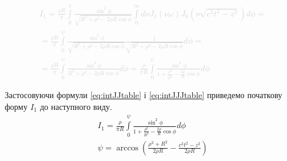 \textcolor{lightgray}{ \begin{equation*} \begin{aligned}
I_1 = \frac{\rho R}{\pi} \int\limits_{0}^{\pi} 
\frac{\sin^2{\phi}}{\sqrt{R^2 + \rho^2 - 2 \rho R \cos \phi}}
\int\limits_{0}^{\infty} d \nu J_1 \left( \nu \omega \right) 
J_0 \left( \nu \sqrt{c^2 t^2 - z^2} \right) d \phi = \\
= \frac{\rho R}{\pi} \int\limits_{0}^{\psi} 
\frac{\sin^2{\phi}}{\sqrt{R^2 + \rho^2 - 2 \rho R \cos \phi}}
\frac{1}{\sqrt{R^2 + \rho^2 - 2 \rho R \cos \phi}} d \phi = \\
= \frac{\rho R}{\pi} \int\limits_{0}^{\psi}
\frac{\sin^2{\phi}}{R^2 + \rho^2 - 2 \rho R \cos \phi} d \phi = 
\frac{\rho}{\pi R} \int\limits_{0}^{\psi}
\frac{\sin^2{\phi}}{1 + \frac{\rho^2}{R^2} - \frac{2 \rho}{R} \cos \phi} d \phi
\end{aligned} \end{equation*} }

Застосовуючи формули \eqref{eq:intJJtable} і \eqref{eq:intJJJtable} приведемо 
початкову форму $ I_1 $ до наступного виду.
%
\begin{equation*} \begin{aligned}
I_1 = \frac{\rho}{\pi R} \int\limits_{0}^{\psi}
\frac{\sin^2{\phi}}{1 + \frac{\rho^2}{R^2} - 
\frac{2 \rho}{R} \cos \phi} d \phi \\
\psi = \arccos \left( \frac{\rho^2 + R^2}{2 \rho R} - 
\frac{c^2 t^2 - z^2}{2 \rho R} \right)
\end{aligned} \end{equation*}

